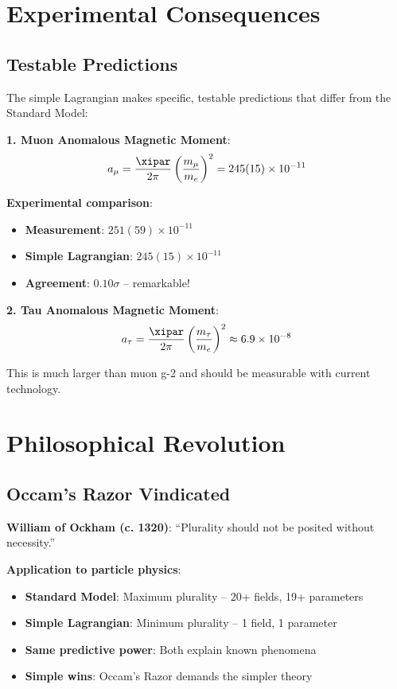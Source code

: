 	\section{Experimental Consequences}
	
	\subsection{Testable Predictions}
	
	The simple Lagrangian makes specific, testable predictions that differ from the Standard Model:
	
	\textbf{1. Muon Anomalous Magnetic Moment}:
	\begin{equation}
		a_{\mu} = \frac{\xipar}{2\pi} \left(\frac{m_{\mu}}{m_e}\right)^2 = 245(15) \times 10^{-11}
	\end{equation}
	
	\textbf{Experimental comparison}:
	\begin{itemize}
		\item \textbf{Measurement}: $251(59) \times 10^{-11}$
		\item \textbf{Simple Lagrangian}: $245(15) \times 10^{-11}$
		\item \textbf{Agreement}: $0.10\sigma$ -- remarkable!
	\end{itemize}
	
	\textbf{2. Tau Anomalous Magnetic Moment}:
	\begin{equation}
		a_{\tau} = \frac{\xipar}{2\pi} \left(\frac{m_{\tau}}{m_e}\right)^2 \approx 6.9 \times 10^{-8}
	\end{equation}
	
	This is much larger than muon g-2 and should be measurable with current technology.
	
	\section{Philosophical Revolution}
	
	\subsection{Occam's Razor Vindicated}
	
	\begin{tcolorbox}[colback=blue!5!white,colframe=blue!75!black,title=Occam's Razor in Pure Form]
		\textbf{William of Ockham (c. 1320)}: ``Plurality should not be posited without necessity.''
		
		\textbf{Application to particle physics}:
		\begin{itemize}
			\item \textbf{Standard Model}: Maximum plurality -- 20+ fields, 19+ parameters
			\item \textbf{Simple Lagrangian}: Minimum plurality -- 1 field, 1 parameter
			\item \textbf{Same predictive power}: Both explain known phenomena
			\item \textbf{Simple wins}: Occam's Razor demands the simpler theory
		\end{itemize}
	\end{tcolorbox}
	
